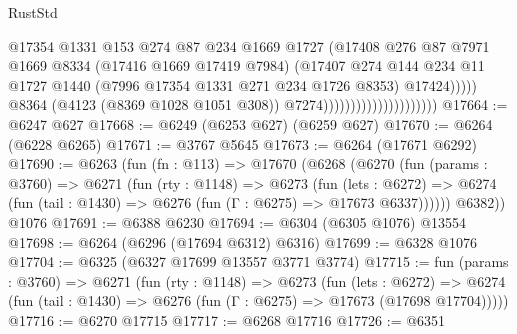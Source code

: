 \begin{lexlean}{RustStd}
\begin{coremodule}
                                                    @17354
                                                    @1331
                                                    @153
                                                    @274
                                                    @87
                                                    @234
                                                    @1669
                                                    @1727
                                                    (@17408
                                                      @276
                                                      @87
                                                      @7971
                                                      @1669
                                                      @8334
                                                      (@17416 @1669 @17419 @7984)
                                                      (@17407
                                                        @274
                                                        @144
                                                        @234
                                                        @11
                                                        @1727
                                                        @1440
                                                        (@7996 @17354 @1331 @271 @234 @1726 @8353)
                                                        @17424)))))
                                              @8364
                                              (@4123 (@8369 @1028 @1051 @308))
                                              @7274)))))))))))))))))))))
@17664 := @6247 @627
@17668 := @6249 (@6253 @627) (@6259 @627)
@17670 := @6264 (@6228 @6265)
@17671 := @3767 @5645
@17673 := @6264 (@17671 @6292)
@17690 := @6263
    (fun (fn : @113) =>
    @17670
      (@6268
        (@6270
          (fun (params : @3760) =>
          @6271
            (fun (rty : @1148) =>
            @6273
              (fun (lets : @6272) =>
              @6274 (fun (tail : @1430) => @6276 (fun (Γ : @6275) => @17673 @6337))))))
        @6382))
    @1076
@17691 := @6388 @6230
@17694 := @6304 (@6305 @1076) @13554
@17698 := @6264 (@6296 (@17694 @6312) @6316)
@17699 := @6328 @1076
@17704 := @6325 (@6327 @17699 @13557 @3771 @3774)
@17715 := fun (params : @3760) =>
  @6271
    (fun (rty : @1148) =>
    @6273
      (fun (lets : @6272) =>
      @6274 (fun (tail : @1430) => @6276 (fun (Γ : @6275) => @17673 (@17698 @17704)))))
@17716 := @6270 @17715
@17717 := @6268 @17716
@17726 := @6351

\end{coremodule}
\end{lexlean}
